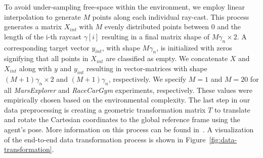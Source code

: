 To avoid under-sampling free-space within the environment, we employ linear interpolation to generate $M$ points along each individual ray-cast. This process generates a matrix $X_{int}$ with $M$ evenly distributed points between 0 and the length of the i-th raycast $\gamma[i]$ resulting in a final matrix shape of $M\gamma_n\times2$. A corresponding target vector $y_{int}$, with shape $M\gamma_n$, is initialized with zeros signifying that all points in $X_{int}$ are classified as empty. We concatenate $X$ and $X_{int}$ along with $y$ and $y_{int}$ resulting in vector-matrices with shape $(M+1)\gamma_n\times2$ and $(M+1)\gamma_n$, respectively. We specify $M=1$ and $M=20$ for all \textit{MarsExplorer} and \textit{RaceCarGym} experiments, respectively. These values were empirically chosen based on the environmental complexity. The last step in our data preprocessing is creating a geometric transformation matrix $T$ to translate and rotate the Cartesian coordinates to the global reference frame using the agent's pose. More information on this process can be found in~\cite{cullen2012matrices}. A visualization of the end-to-end data transformation process is shown in Figure~\ref{fig:data-transformation}.

